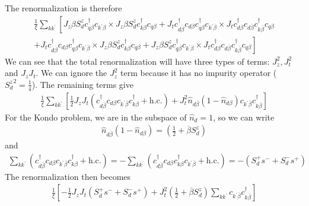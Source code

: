 \documentclass[twoside]{report}
\numberwithin{equation}{section}
\begin{document}
The renormalization is therefore
\begin{equation}\begin{aligned}
	\frac{1}{\xi}\sum_{kk^\prime} \left[J_z \beta S_d^z c^\dagger_{q\beta}c_{k^\prime\beta}\times J_z \beta S_d^z c^\dagger_{k\beta}c_{q\beta} + J_t  c^\dagger_{d\overline\beta}c_{d\beta} c^\dagger_{q\beta}c_{k^\prime\overline\beta} \times J_t  c^\dagger_{d\beta}c_{d\overline\beta} c^\dagger_{k\overline\beta}c_{q\beta}\right.\\
	+\left. J_t  c^\dagger_{d\overline\beta}c_{d\beta} c^\dagger_{q\beta}c_{k^\prime\overline\beta}\times J_z \beta S_d^z c^\dagger_{k\beta}c_{q\beta} + J_z \beta S_d^z c^\dagger_{q\beta}c_{k^\prime\beta}\times J_t  c^\dagger_{d\beta}c_{d\overline\beta} c^\dagger_{k\overline\beta}c_{q\beta}\right]
\end{aligned}\end{equation}
We can see that the total renormalization will have three types of terms: \(J_z^2, J_t^2\) and \(J_z J_t\). We can ignore the \(J_z^2\) term because it has no impurity operator (\({S_d^z}^2 = \frac{1}{4}\)). The remaining terms give
\begin{equation}\begin{aligned}
	\label{kondo_part}
	\frac{1}{\xi}\sum_{kk^\prime} \left[\frac{1}{2} J_z J_t\left(c^\dagger_{d\overline\beta}c_{d\beta}c_{k^\prime\overline\beta}c^\dagger_{k\beta} + \text{h.c.}\right) + J_t^2 \hat n_{d\overline\beta}\left(1 - \hat n_{d\beta}\right) c_{k^\prime\overline\beta}c^\dagger_{k\overline\beta}\right]
\end{aligned}\end{equation}
For the Kondo problem, we are in the subspace of \(\hat n_d= 1\), so we can write
\begin{equation}\begin{aligned}
	\hat n_{d\overline\beta}\left(1 - \hat n_{d\beta}\right) = \left(\frac{1}{2} +  \overline\beta S_d^z \right)
\end{aligned}\end{equation}
and
\begin{equation}\begin{aligned}
	\sum_{kk^\prime}\left( c^\dagger_{d\overline\beta}c_{d\beta}c_{k^\prime\overline\beta}c^\dagger_{k\beta} + \text{h.c.}\right) = -\sum_{kk^\prime}\left( c^\dagger_{d\overline\beta}c_{d\beta}c^\dagger_{k\beta}c_{k^\prime\overline\beta} + \text{h.c.}\right) = -\left(S_d^+ s^- + S_d^- s^+\right)
\end{aligned}\end{equation}
The renormalization then becomes
\begin{equation}\begin{aligned}
	\frac{1}{\xi} \left[-\frac{1}{2} J_z J_t\left(S_d^+ s^- + S_d^- s^+\right) + J_t^2 \left(\frac{1}{2} +  \overline\beta S_d^z \right) \sum_{kk^\prime}c_{k^\prime\overline\beta}c^\dagger_{k\overline\beta}\right]
\end{aligned}\end{equation}
\end{document}
